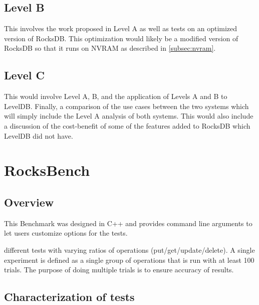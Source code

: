\documentclass[twocolumn,11pt]{article}
\begin{document}
\subsection{Level B}

This involves the work proposed in Level A as well as tests on an optimized
version of RocksDB. This optimization would likely be a modified version of
RocksDB so that it runs on NVRAM as described in \ref{subsec:nvram}.

\subsection{Level C}

This would involve Level A, B, and the application of Levels A and B to LevelDB.
Finally, a comparison of the use cases between the two systems which will simply
include the Level A analysis of both systems. This would also include a
discussion of the cost-benefit of some of the features added to RocksDB which
LevelDB did not have.

\section{RocksBench}

\subsection{Overview}

This Benchmark was designed in C++ and provides command line arguments to let
users customize options for the tests.

different tests with varying ratios of operations (put/get/update/delete). A
single experiment is defined as a single group of operations that is run with at
least 100 trials. The purpose of doing multiple trials is to ensure accuracy of
results.

\subsection{Characterization of tests}
\label{subsec:characterization_tests}
\end{document}
